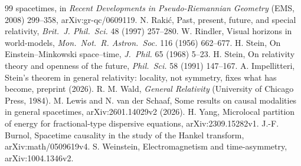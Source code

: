 \documentclass[11pt]{article}
\theoremstyle{definition}
\begin{document}
\begin{thebibliography}{99}
spacetimes, in \emph{Recent Developments in Pseudo-Riemannian Geometry}
(EMS, 2008) 299--358, arXiv:gr-qc/0609119.
 N. Raki\'c, Past, present, future, and special relativity,
\emph{Brit.\ J. Phil.\ Sci.} 48 (1997) 257--280.
 W. Rindler, Visual horizons in world-models,
\emph{Mon.\ Not.\ R. Astron.\ Soc.} 116 (1956) 662--677.
 H. Stein, On Einstein--Minkowski space--time, \emph{J.\
Phil.} 65 (1968) 5--23.
 H. Stein, On relativity theory and openness of the future,
\emph{Phil.\ Sci.} 58 (1991) 147--167.
 A. Impellitteri, Stein's theorem in general relativity:
locality, not symmetry, fixes what has become, preprint (2026).
 R. M. Wald, \emph{General Relativity} (University of
Chicago Press, 1984).
 M. Lewis and N. van der Schaaf, Some results on causal
modalities in general spacetimes, arXiv:2601.14029v2 (2026).
 H. Yang, Microlocal partition of energy for fractional-type dispersive equations, arXiv:2309.15282v1.
\bibitem[Burnol(2006)]{Burnol2006} J.-F. Burnol, Spacetime causality in the study of the Hankel transform, arXiv:math/0509619v4.
\bibitem[Weinstein(2011)]{Weinstein2011} S. Weinstein, Electromagnetism and time-asymmetry, arXiv:1004.1346v2.
\end{thebibliography}
\end{document}
